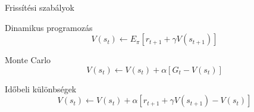 \documentclass[english, aspectratio=169]{beamer}
\begin{document}
\begin{frame}{Frissítési szabályok}
\begin{block}{Dinamikus programozás}
\[
V(s_t) \leftarrow E_\pi \left[ r_{t+1} + \gamma V(s_{t+1}) \right]
\]
\end{block}
\vspace{0.5cm}
\begin{block}{Monte Carlo}
\[
V(s_t) \leftarrow V(s_t) + \alpha \left[ G_t - V(s_t) \right]
\]
\end{block}
\vspace{0.5cm}
\begin{block}{Időbeli különbségek}
\[
V(s_t) \leftarrow V(s_t) + \alpha \left[ r_{t+1} + \gamma V(s_{t+1}) - V(s_t) \right]
\]
\end{block}
\end{frame}
\end{document}
